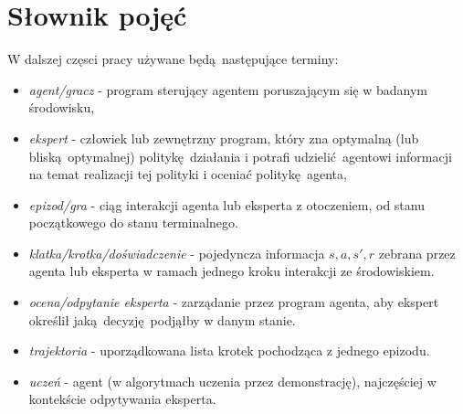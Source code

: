 \section{Słownik pojęć}

W dalszej częsci pracy używane będą następujące terminy:

\begin{itemize}
\item \textit{agent/gracz} - program sterujący agentem poruszającym się w badanym środowisku,
\item \textit{ekspert} - człowiek lub zewnętrzny program, który zna optymalną (lub bliską optymalnej) politykę działania i potrafi udzielić agentowi informacji na temat realizacji tej polityki i oceniać politykę agenta,
\item \textit{epizod/gra} - ciąg interakcji agenta lub eksperta z otoczeniem, od stanu początkowego do stanu terminalnego.
\item \textit{klatka/krotka/doświadczenie} - pojedyncza informacja $s,a,s',r$ zebrana przez agenta lub eksperta w ramach jednego kroku interakcji ze środowiskiem.  
\item \textit{ocena/odpytanie eksperta} - zarządanie przez program agenta, aby ekspert określił jaką decyzję podjąłby w danym stanie.
\item \textit{trajektoria} - uporządkowana lista krotek pochodząca z jednego epizodu.
\item \textit{uczeń} - agent (w algorytmach uczenia przez demonstrację), najczęściej w kontekście odpytywania eksperta.
\end{itemize}
